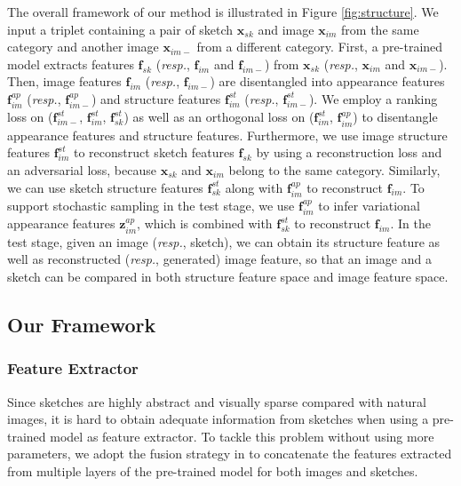 \documentclass[10pt,twocolumn,letterpaper]{article}
\begin{document}
The overall framework of our method is illustrated in Figure \ref{fig:structure}. 
We input a triplet containing a pair of sketch $\mathbf{x}_{sk}$ and image $\mathbf{x}_{im}$ from the same category and another image $\mathbf{x}_{im-}$ from a different category. First, a pre-trained model extracts features $\mathbf{f}_{sk}$ (\emph{resp.}, $\mathbf{f}_{im}$ and $\mathbf{f}_{im-}$) from $\mathbf{x}_{sk}$ (\emph{resp.}, $\mathbf{x}_{im}$ and $\mathbf{x}_{im-}$).
Then, image features $\mathbf{f}_{im}$ (\emph{resp.}, $\mathbf{f}_{im-}$) are disentangled into appearance features $\mathbf{f}_{im}^{ap}$ (\emph{resp.}, $\mathbf{f}_{im-}^{ap}$) and structure features $\mathbf{f}_{im}^{st}$ (\emph{resp.}, $\mathbf{f}_{im-}^{st}$). We employ a ranking loss on ($\mathbf{f}_{im-}^{st}$, $\mathbf{f}_{im}^{st}$, $\mathbf{f}_{sk}^{st}$) as well as an orthogonal loss on ($\mathbf{f}_{im}^{st}$, $\mathbf{f}_{im}^{ap}$) to disentangle appearance features and structure features. Furthermore, we use image structure features $\mathbf{f}_{im}^{st}$ to reconstruct sketch features $\mathbf{f}_{sk}$ by using a reconstruction loss and an adversarial loss, because $\mathbf{x}_{sk}$ and $\mathbf{x}_{im}$ belong to the same category. Similarly, we can use sketch structure features $\mathbf{f}_{sk}^{st}$ along with $\mathbf{f}_{im}^{ap}$ to reconstruct $\mathbf{f}_{im}$. To support stochastic sampling in the test stage, we use $\mathbf{f}_{im}^{ap}$ to infer variational appearance features $\mathbf{z}_{im}^{ap}$, which is combined with $\mathbf{f}_{sk}^{st}$ to reconstruct $\mathbf{f}_{im}$. In the test stage, given an image (\emph{resp.}, sketch), we can obtain its structure feature as well as reconstructed (\emph{resp.}, generated) image feature, so that an image and a sketch can be compared in both structure feature space and image feature space. 

\subsection{Our Framework} \label{3.2}

\subsubsection{Feature Extractor} 
Since sketches are highly abstract and visually sparse compared with natural images, it is hard to obtain adequate information from sketches when using a pre-trained model as feature extractor. To tackle this problem without using more parameters, we adopt the fusion strategy in \cite{wang2019stacked} to concatenate the features extracted from multiple layers of the pre-trained model for both images and sketches.
\end{document}
